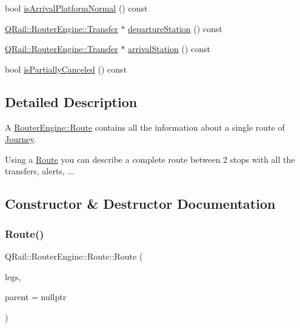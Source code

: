 \begin{DoxyCompactItemize}
bool \mbox{\hyperlink{classQRail_1_1RouterEngine_1_1Route_a62c9bf4d8a4d469209e53a69b0b0b97d}{is\+Arrival\+Platform\+Normal}} () const
\item 
\mbox{\hyperlink{classQRail_1_1RouterEngine_1_1Transfer}{Q\+Rail\+::\+Router\+Engine\+::\+Transfer}} $\ast$ \mbox{\hyperlink{classQRail_1_1RouterEngine_1_1Route_a701ee12679ec806caf823b9b81ab5fac}{departure\+Station}} () const
\item 
\mbox{\hyperlink{classQRail_1_1RouterEngine_1_1Transfer}{Q\+Rail\+::\+Router\+Engine\+::\+Transfer}} $\ast$ \mbox{\hyperlink{classQRail_1_1RouterEngine_1_1Route_a027668889cddf1a31b536c7a0c4de8c8}{arrival\+Station}} () const
\item 
bool \mbox{\hyperlink{classQRail_1_1RouterEngine_1_1Route_a8daf1b60443b10ba4c730121c8e3dbe0}{is\+Partially\+Canceled}} () const
\end{DoxyCompactItemize}


\subsection{Detailed Description}
A \mbox{\hyperlink{classQRail_1_1RouterEngine_1_1Route}{Router\+Engine\+::\+Route}} contains all the information about a single route of \mbox{\hyperlink{classQRail_1_1RouterEngine_1_1Journey}{Journey}}. 

Using a \mbox{\hyperlink{classQRail_1_1RouterEngine_1_1Route}{Route}} you can describe a complete route between 2 stops with all the transfers, alerts, ... 

\subsection{Constructor \& Destructor Documentation}
\mbox{\label{classQRail_1_1RouterEngine_1_1Route_a1a97cacc398b14f41b9c755b492b6b35}} 
\subsubsection{\texorpdfstring{Route()}{Route()}\hspace{0.1cm}{\footnotesize\ttfamily [1/2]}}
{\footnotesize\ttfamily Q\+Rail\+::\+Router\+Engine\+::\+Route\+::\+Route (\begin{DoxyParamCaption}\item[{const Q\+List$<$ \mbox{\hyperlink{classQRail_1_1RouterEngine_1_1RouteLeg}{Route\+Leg}} $\ast$ $>$ \&}]{legs,  }\item[{Q\+Object $\ast$}]{parent = {\ttfamily nullptr} }\end{DoxyParamCaption})\hspace{0.3cm}{\ttfamily [explicit]}}



